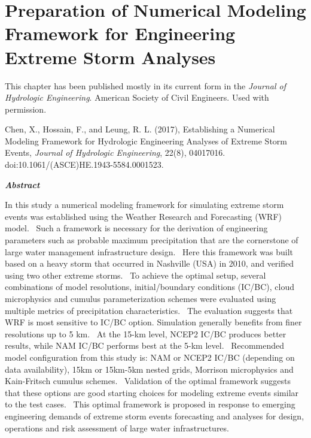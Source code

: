 \chapter {Preparation of Numerical Modeling Framework for Engineering Extreme Storm Analyses}
\label{ch:JHE}
 
This chapter has been published mostly in its current form in the \textit{Journal of Hydrologic Engineering}. \textcopyright American Society of Civil Engineers. Used with permission.\\

\bigbreak

\noindent
{}
\setlength{\hangindent}{2em}
Chen, X., Hossain, F., and Leung, R. L. (2017), Establishing a Numerical Modeling Framework for Hydrologic Engineering Analyses of Extreme Storm Events, \textit{Journal of Hydrologic Engineering}, 22(8), 04017016. doi:10.1061/(ASCE)HE.1943-5584.0001523.

\vspace{10mm}

\noindent
\textit{\textbf{Abstract}}
 
In this study a numerical modeling framework for simulating extreme storm events was established using the Weather Research and Forecasting (WRF) model. \
Such a framework is necessary for the derivation of engineering parameters such as probable maximum precipitation that are the cornerstone of large water management infrastructure design. \
Here this framework was built based on a heavy storm that occurred in Nashville (USA) in 2010, and verified using two other extreme storms. \
To achieve the optimal setup, several combinations of model resolutions, initial/boundary conditions (IC/BC), cloud microphysics and cumulus parameterization schemes were evaluated using multiple metrics of precipitation characteristics. \
The evaluation suggests that WRF is most sensitive to IC/BC option. Simulation generally benefits from finer resolutions up to 5 km. \
At the 15-km level, NCEP2 IC/BC produces better results, while NAM IC/BC performs best at the 5-km level. \
Recommended model configuration from this study is: NAM or NCEP2 IC/BC (depending on data availability), 15km or 15km-5km nested grids, Morrison microphysics and Kain-Fritsch cumulus schemes. \
Validation of the optimal framework suggests that these options are good starting choices for modeling extreme events similar to the test cases. \
This optimal framework is proposed in response to emerging engineering demands of extreme storm events forecasting and analyses for design, operations and risk assessment of large water infrastructures.

